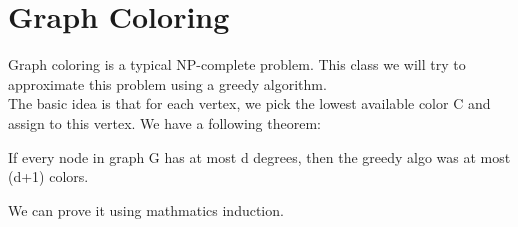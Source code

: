 \documentclass[usletter]{article}
\begin{document}
\section{Graph Coloring}
Graph coloring is a typical NP-complete problem. This class we will try to approximate this problem using a greedy algorithm. \\
The basic idea is that for each vertex, we pick the lowest available color C and assign to this vertex. We have a following theorem:\\

\begin{theorem}
If every node in graph G has at most d degrees, then the greedy algo was at most (d+1) colors.
\end{theorem}
We can prove it using mathmatics induction.\\



\end{document}
